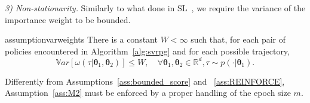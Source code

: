 \documentclass{article}
\theoremstyle{remark}
\theoremstyle{definition}
\newcommand{\realspace}{\mathbb R}      %
\newcommand{\vtheta}{\boldsymbol{\theta}}
\newcommand{\VARIS}{W}
\begin{document}
\textit{3) Non-stationarity.} 
Similarly to what done in SL~\citep{cortes2010learning}, we require the variance of the importance weight to be bounded.
	\begin{restatable}{assumption}{varweights}\label{ass:M2}
		There is a constant $W<\infty$ such that, for each pair of policies encountered in Algorithm~\ref{alg:svrpg} and for each possible trajectory,
		\[
                \mathbb{V}ar\left[\omega(\tau| \vtheta_1, \vtheta_2)\right] \leq \VARIS, \quad \forall \vtheta_1,\vtheta_2 \in \realspace^d , \tau \sim p(\cdot|\vtheta_1).
		\]
	\end{restatable}
Differently from Assumptions~\ref{ass:bounded_score} and ~\ref{ass:REINFORCE}, Assumption~\ref{ass:M2} must be enforced by a proper handling of the epoch size $m$.
\end{document}
